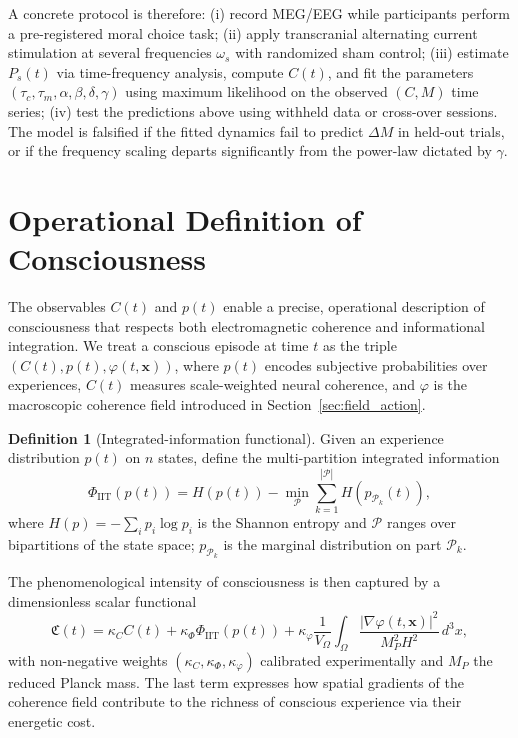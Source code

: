 \documentclass[12pt,a4paper]{article}
\theoremstyle{definition}
\newtheorem{definition}{Definition}[section]
\begin{document}
A concrete protocol is therefore: (i) record MEG/EEG while participants perform a pre-registered moral choice task; (ii) apply transcranial alternating current stimulation at several frequencies $\omega_s$ with randomized sham control; (iii) estimate $P_s(t)$ via time-frequency analysis, compute $C(t)$, and fit the parameters $(\tau_c,\tau_m,\alpha,\beta,\delta,\gamma)$ using maximum likelihood on the observed $(C,M)$ time series; (iv) test the predictions above using withheld data or cross-over sessions. The model is falsified if the fitted dynamics fail to predict $\Delta M$ in held-out trials, or if the frequency scaling departs significantly from the power-law dictated by $\gamma$.

\section{Operational Definition of Consciousness}

The observables $C(t)$ and $p(t)$ enable a precise, operational description of consciousness that respects both electromagnetic coherence and informational integration. We treat a conscious episode at time $t$ as the triple $(C(t), p(t), \varphi(t,\mathbf{x}))$, where $p(t)$ encodes subjective probabilities over experiences, $C(t)$ measures scale-weighted neural coherence, and $\varphi$ is the macroscopic coherence field introduced in Section~\ref{sec:field_action}.

\begin{definition}[Integrated-information functional\cite{Tononi2004}]
Given an experience distribution $p(t)$ on $n$ states, define the multi-partition integrated information
\begin{equation}
\Phi_{\text{IIT}}(p(t)) = H(p(t)) - \min_{\mathcal{P}} \sum_{k=1}^{|\mathcal{P}|} H\!\left(p_{\mathcal{P}_k}(t)\right),
\end{equation}
where $H(p) = -\sum_i p_i \log p_i$ is the Shannon entropy and $\mathcal{P}$ ranges over bipartitions of the state space; $p_{\mathcal{P}_k}$ is the marginal distribution on part $\mathcal{P}_k$.
\end{definition}

The phenomenological intensity of consciousness is then captured by a dimensionless scalar functional
\begin{equation}
\label{eq:conscious_intensity}
\mathfrak{C}(t) = \kappa_C C(t) + \kappa_\Phi \Phi_{\text{IIT}}(p(t)) + \kappa_\varphi \frac{1}{V_\Omega} \int_{\Omega} \frac{|\nabla \varphi(t,\mathbf{x})|^2}{M_P^2 H^2} \, d^3x,
\end{equation}
with non-negative weights $(\kappa_C,\kappa_\Phi,\kappa_\varphi)$ calibrated experimentally and $M_P$ the reduced Planck mass. The last term expresses how spatial gradients of the coherence field contribute to the richness of conscious experience via their energetic cost.
\end{document}
